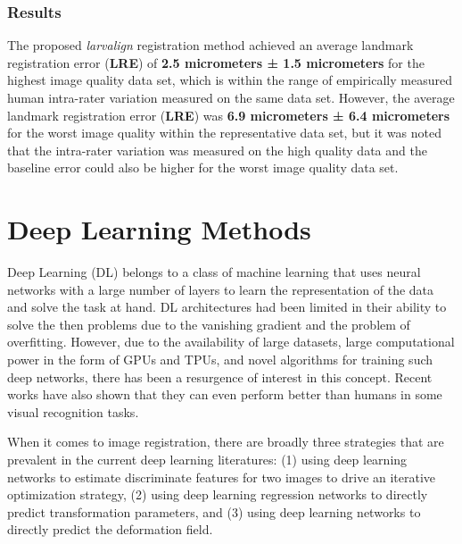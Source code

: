 \documentclass{book}
\begin{document}
	\subsubsection{Results}
	\label{subsubsection:result}
	The proposed \emph{{larvalign}} registration method achieved an average landmark registration error (\textbf{LRE}) of \textbf{2.5 micrometers ± 1.5 micrometers} for the highest image quality data set, which is within the range of empirically measured human intra-rater variation measured on the same data set. However, the average landmark registration error (\textbf{LRE}) was \textbf{6.9 micrometers ± 6.4 micrometers} for the worst image quality within the representative data set, but it was noted that the intra-rater variation was measured on the high quality data and the baseline error could also be higher for the worst image quality data set.
	
	\section{Deep Learning Methods}
	\label{section:dl}
	
	Deep Learning (DL) belongs to a class of machine learning that uses neural networks with a large number of layers to learn the representation of the data and solve the task at hand. DL architectures had been limited in their ability to solve the then problems due to the vanishing gradient and the problem of overfitting. However, due to the availability of large datasets, large computational power in the form of GPUs and TPUs, and novel algorithms for training such deep networks, there has been a resurgence of interest in this concept. Recent works have also shown that they can even perform better than humans in some visual recognition tasks.
	
	When it comes to image registration, there are broadly three strategies that are prevalent in the current deep learning literatures: (1) using deep learning networks to estimate discriminate features for two images to drive an iterative optimization strategy, (2) using deep learning regression networks to directly predict transformation parameters, and (3) using deep learning networks to directly predict the deformation field. \cite{Litjens_2017}
	
\end{document}

